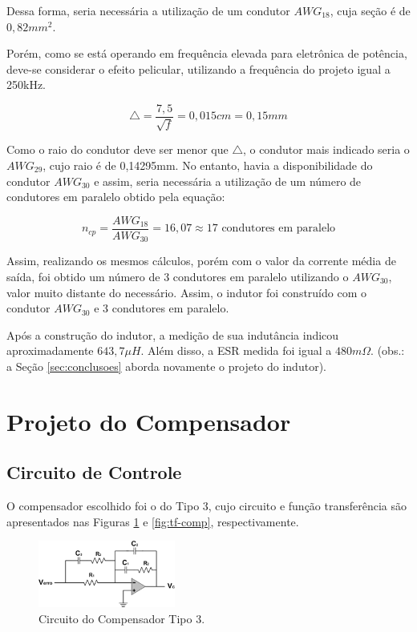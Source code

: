 \documentclass[a4paper]{article}
\begin{document}
{Dessa forma, seria necessária a utilização de um condutor $AWG_{18}$, cuja seção é de $0,82mm^2$.

Porém, como se está operando em frequência elevada para eletrônica de potência, deve-se considerar o efeito pelicular, utilizando a frequência do projeto igual a 250kHz.

\begin{equation*}
\triangle= \frac{7,5}{\sqrt{f}} = 0,015 cm = 0,15mm
\end{equation*}

Como o raio do condutor deve ser menor que $\triangle$, o condutor mais indicado seria o $AWG_{29}$, cujo raio é de 0,14295mm. No entanto, havia a disponibilidade do condutor $AWG_{30}$ e assim, seria necessária a utilização de um número de condutores em paralelo obtido pela equação:

\begin{equation*}
n_{cp} = \frac{AWG_{18}}{AWG_{30}} = 16,07 \approx 17 \text{ condutores em paralelo}
\end{equation*}

Assim, realizando os mesmos cálculos, porém com o valor da corrente média de saída, foi obtido um número de 3 condutores em paralelo utilizando o $AWG_{30}$, valor muito distante do necessário. Assim, o indutor foi construído com o condutor $AWG_{30}$ e 3 condutores em paralelo.

Após a construção do indutor, a medição de sua indutância indicou aproximadamente $643,7\mu H$. Além disso, a ESR medida foi igual a $480m\Omega$. (obs.: a Seção \ref{sec:conclusoes} aborda novamente o projeto do indutor).

\clearpage

\section{Projeto do Compensador}

\subsection{Circuito de Controle}

O compensador escolhido foi o do Tipo 3, cujo circuito e função transferência são apresentados nas Figuras \ref{fig:sch-comp} e \ref{fig:tf-comp}, respectivamente.

\begin{figure}[H]
	\centering
	\includegraphics[width=0.4\textwidth]{sch-comp.jpg}
	\caption{Circuito do Compensador Tipo 3.}
	\label{fig:sch-comp}
\end{figure}

}
\end{document}
